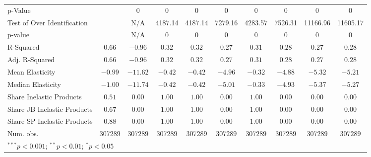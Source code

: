 \documentclass{article}
\begin{document}
\begin{table}
{\begin{tabular}{l c c c c c c c c c}
p-Value                     &               & 0             & 0             & 0             & 0             & 0             & 0             & 0             & 0             \\
Test of Over Identification &               & N/A           & 4187.14       & 4187.14       & 7279.16       & 4283.57       & 7526.31       & 11166.96      & 11605.17      \\
p-value                     &               & N/A           & 0             & 0             & 0             & 0             & 0             & 0             & 0             \\
R-Squared                   & $0.66$        & $-0.96$       & $0.32$        & $0.32$        & $0.27$        & $0.31$        & $0.28$        & $0.27$        & $0.28$        \\
Adj. R-Squared              & $0.66$        & $-0.96$       & $0.32$        & $0.32$        & $0.27$        & $0.31$        & $0.28$        & $0.27$        & $0.28$        \\
Mean Elasticity             & $-0.99$       & $-11.62$      & $-0.42$       & $-0.42$       & $-4.96$       & $-0.32$       & $-4.88$       & $-5.32$       & $-5.21$       \\
Median Elasticity           & $-1.00$       & $-11.74$      & $-0.42$       & $-0.42$       & $-5.01$       & $-0.33$       & $-4.93$       & $-5.37$       & $-5.27$       \\
Share Inelastic Products    & $0.51$        & $0.00$        & $1.00$        & $1.00$        & $0.00$        & $1.00$        & $0.00$        & $0.00$        & $0.00$        \\
Share JB Inelastic Products & $0.67$        & $0.00$        & $1.00$        & $1.00$        & $0.00$        & $1.00$        & $0.00$        & $0.00$        & $0.00$        \\
Share SP Inelastic Products & $0.88$        & $0.00$        & $1.00$        & $1.00$        & $0.00$        & $1.00$        & $0.00$        & $0.00$        & $0.00$        \\
Num. obs.                   & $307289$      & $307289$      & $307289$      & $307289$      & $307289$      & $307289$      & $307289$      & $307289$      & $307289$      \\
\bottomrule
\multicolumn{10}{l}{\scriptsize{$^{***}p<0.001$; $^{**}p<0.01$; $^{*}p<0.05$}}
\end{tabular}
        }
    \end{table}
\end{document}
